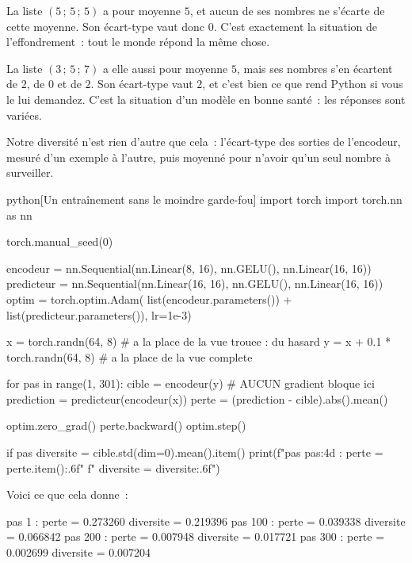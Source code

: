 \begin{exemple}
La liste $(5 \,;\, 5 \,;\, 5)$ a pour moyenne $5$, et aucun de ses nombres
ne s'écarte de cette moyenne. Son écart-type vaut donc $0$. C'est exactement
la situation de l'effondrement~: tout le monde répond la même chose.

La liste $(3 \,;\, 5 \,;\, 7)$ a elle aussi pour moyenne $5$, mais ses
nombres s'en écartent de $2$, de $0$ et de $2$. Son écart-type vaut $2$, et
c'est bien ce que rend Python si vous le lui demandez. C'est la situation
d'un modèle en bonne santé~: les réponses sont variées.
\end{exemple}

Notre diversité n'est rien d'autre que cela~: l'écart-type des sorties de
l'encodeur, mesuré d'un exemple à l'autre, puis moyenné pour n'avoir qu'un
seul nombre à surveiller.

\begin{code}{python}[Un entraînement sans le moindre garde-fou]
import torch
import torch.nn as nn

torch.manual_seed(0)

encodeur = nn.Sequential(nn.Linear(8, 16), nn.GELU(), nn.Linear(16, 16))
predicteur = nn.Sequential(nn.Linear(16, 16), nn.GELU(), nn.Linear(16, 16))
optim = torch.optim.Adam(
    list(encodeur.parameters()) + list(predicteur.parameters()), lr=1e-3)

x = torch.randn(64, 8)             # a la place de la vue trouee : du hasard
y = x + 0.1 * torch.randn(64, 8)   # a la place de la vue complete

for pas in range(1, 301):
    cible = encodeur(y)                # AUCUN gradient bloque ici
    prediction = predicteur(encodeur(x))
    perte = (prediction - cible).abs().mean()

    optim.zero_grad()
    perte.backward()
    optim.step()

    if pas %
        diversite = cible.std(dim=0).mean().item()
        print(f"pas {pas:4d} : perte = {perte.item():.6f}"
              f"   diversite = {diversite:.6f}")
\end{code}

Voici ce que cela donne~:

\begin{sortie}
pas    1 : perte = 0.273260   diversite = 0.219396
pas  100 : perte = 0.039338   diversite = 0.066842
pas  200 : perte = 0.007948   diversite = 0.017721
pas  300 : perte = 0.002699   diversite = 0.007204
\end{sortie}

